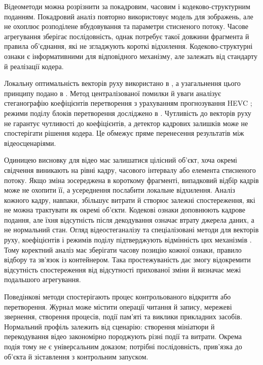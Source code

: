 Відеометоди можна розрізнити за покадровим, часовим і кодеково-структурним поданням. Покадровий аналіз повторно використовує модель для зображень, але не охоплює розподілене вбудовування та параметри стисненого потоку. Часове агрегування зберігає послідовність, однак потребує такої довжини фрагмента й правила об’єднання, які не згладжують короткі відхилення. Кодеково-структурні ознаки є інформативними для відповідного механізму, але залежать від стандарту й реалізації кодера.

Локальну оптимальність векторів руху використано в \cite{liu2021hevclocaloptimality}, а узагальнення цього принципу подано в \cite{zhai2025generalized}. Метод централізованої помилки й уваги аналізує стеганографію коефіцієнтів перетворення з урахуванням прогнозування HEVC \cite{dai2025centralized}; режими поділу блоків перетворення досліджено в \cite{cao2026hevcpartition}. Чутливість до векторів руху не гарантує чутливості до коефіцієнтів, а детектор кадрових залишків може не спостерігати рішення кодера. Це обмежує пряме перенесення результатів між відеосценаріями.

Одиницею висновку для відео має залишатися цілісний об’єкт, хоча окремі свідчення виникають на рівні кадру, часового інтервалу або елемента стисненого потоку. Якщо зміна зосереджена в короткому фрагменті, випадковий відбір кадрів може не охопити її, а усереднення послабити локальне відхилення. Аналіз кожного кадру, навпаки, збільшує витрати й створює залежні спостереження, які не можна трактувати як окремі об’єкти. Кодекові ознаки доповнюють кадрове подання, але їхня відсутність після декодування означає втрату джерела даних, а не нормальний стан. Огляд відеостеганалізу та спеціалізовані методи для векторів руху, коефіцієнтів і режимів поділу підтверджують відмінність цих механізмів \cite{bouzegza2022video,liu2021hevclocaloptimality,dai2025centralized,cao2026hevcpartition}. Тому коректний аналіз має зберігати часову позицію кожної ознаки, правило відбору та зв’язок із контейнером. Така простежуваність дає змогу відокремити відсутність спостереження від відсутності прихованої зміни й визначає межі подальшого агрегування.

Поведінкові методи спостерігають процес контрольованого відкриття або перетворення. Журнал може містити операції читання й запису, мережеві звернення, створення процесів, події пам’яті та виклики прикладних засобів. Нормальний профіль залежить від сценарію: створення мініатюри й перекодування відео закономірно породжують різні події та витрати. Окрема подія тому не є універсальним доказом; потрібні послідовність, прив’язка до об’єкта й зіставлення з контрольним запуском.


